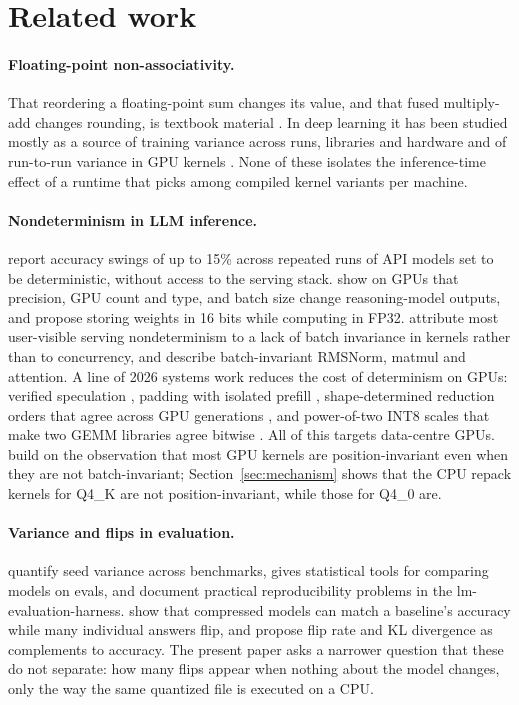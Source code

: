 \section{Related work}
\label{sec:related}

\paragraph{Floating-point non-associativity.}
That reordering a floating-point sum changes its value, and that fused multiply-add changes
rounding, is textbook material \citep{goldberg1991,ieee754,monniaux2008}. In deep learning it has
been studied mostly as a source of training variance across runs, libraries and hardware
\citep{pham2020,zhuang2022} and of run-to-run variance in GPU kernels
\citep{shanmugavelu2024}. None of these isolates the inference-time effect of a runtime that
picks among compiled kernel variants per machine.

\paragraph{Nondeterminism in LLM inference.}
\citet{atil2024} report accuracy swings of up to 15\% across repeated runs of API models set to
be deterministic, without access to the serving stack. \citet{yuan2025} show on GPUs that
precision, GPU count and type, and batch size change reasoning-model outputs, and propose
storing weights in 16 bits while computing in FP32. \citet{he2025} attribute most
user-visible serving nondeterminism to a lack of batch invariance in kernels rather than to
concurrency, and describe batch-invariant RMSNorm, matmul and attention. A line of 2026 systems
work reduces the cost of determinism on GPUs: verified speculation \citep{gond2026}, padding
with isolated prefill \citep{zhao2026}, shape-determined reduction orders that agree across GPU
generations \citep{cooper2026}, and power-of-two INT8 scales that make two GEMM libraries agree
bitwise \citep{chen2026}. All of this targets data-centre GPUs. \citet{zhao2026} build on the
observation that most GPU kernels are position-invariant even when they are not batch-invariant;
Section~\ref{sec:mechanism} shows that the CPU repack kernels for Q4\_K are not
position-invariant, while those for Q4\_0 are.

\paragraph{Variance and flips in evaluation.}
\citet{madaan2024} quantify seed variance across benchmarks, \citet{miller2024} gives
statistical tools for comparing models on evals, and \citet{biderman2024} document practical
reproducibility problems in the lm-evaluation-harness. \citet{dutta2024} show that compressed
models can match a baseline's accuracy while many individual answers flip, and propose flip rate
and KL divergence as complements to accuracy. The present paper asks a narrower question that
these do not separate: how many flips appear when nothing about the model changes, only the way
the same quantized file is executed on a CPU.

